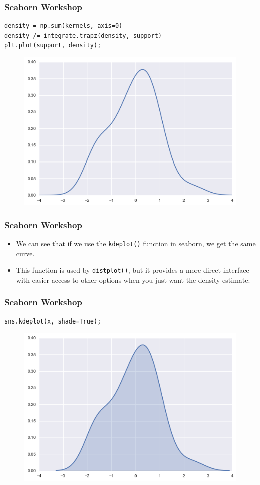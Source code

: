 \documentclass{beamer}
\begin{document}
\begin{frame}[fragile]
\frametitle{Seaborn Workshop}
	\large
\begin{verbatim}
density = np.sum(kernels, axis=0)
density /= integrate.trapz(density, support)
plt.plot(support, density);
\end{verbatim}

\begin{figure}
	\centering
	\includegraphics[width=0.7\linewidth]{images/distributions_18_0}
\end{figure}
\end{frame}
\begin{frame}[fragile]

\frametitle{Seaborn Workshop}
\large
\begin{itemize}
\item We can see that if we use the \texttt{kdeplot()} function in seaborn, we get the same curve. 
\item This function is used by \texttt{distplot()}, but it provides a more direct interface with easier access to other options when you just want the density estimate:
\end{itemize}


\end{frame}
\begin{frame}[fragile]
	\frametitle{Seaborn Workshop}
	\large
\begin{framed}
\begin{verbatim}
sns.kdeplot(x, shade=True);
\end{verbatim}
\end{framed}

\begin{figure}
\centering
\includegraphics[width=0.7\linewidth]{images/distributions_20_0}
\end{figure}

\end{frame}
\end{document}
